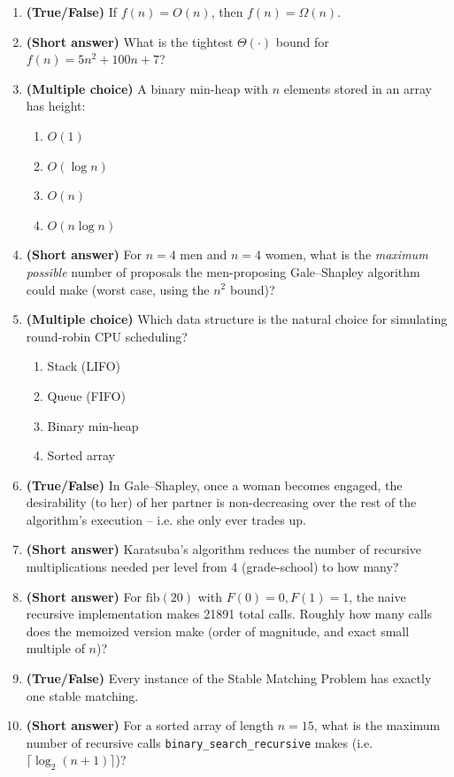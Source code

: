 \documentclass[11pt]{article}
\begin{document}
\begin{enumerate}[label=\textbf{B\arabic*.}, leftmargin=2.2em]

\item \textbf{(True/False)} If $f(n) = O(n)$, then $f(n) = \Omega(n)$.

\item \textbf{(Short answer)} What is the tightest $\Theta(\cdot)$ bound for
$f(n) = 5n^2 + 100n + 7$?

\item \textbf{(Multiple choice)} A binary min-heap with $n$ elements stored in an array
has height:
\begin{enumerate}[label=(\alph*)]
    \item $O(1)$
    \item $O(\log n)$
    \item $O(n)$
    \item $O(n \log n)$
\end{enumerate}

\item \textbf{(Short answer)} For $n=4$ men and $n=4$ women, what is the \emph{maximum
possible} number of proposals the men-proposing Gale--Shapley algorithm could make
(worst case, using the $n^2$ bound)?

\item \textbf{(Multiple choice)} Which data structure is the natural choice for
simulating round-robin CPU scheduling?
\begin{enumerate}[label=(\alph*)]
    \item Stack (LIFO)
    \item Queue (FIFO)
    \item Binary min-heap
    \item Sorted array
\end{enumerate}

\item \textbf{(True/False)} In Gale--Shapley, once a woman becomes engaged, the
desirability (to her) of her partner is non-decreasing over the rest of the algorithm's
execution -- i.e. she only ever trades up.

\item \textbf{(Short answer)} Karatsuba's algorithm reduces the number of recursive
multiplications needed per level from 4 (grade-school) to how many?

\item \textbf{(Short answer)} For $\text{fib}(20)$ with $F(0)=0, F(1)=1$, the naive
recursive implementation makes 21891 total calls. Roughly how many calls does the
memoized version make (order of magnitude, and exact small multiple of $n$)?

\item \textbf{(True/False)} Every instance of the Stable Matching Problem has exactly one
stable matching.

\item \textbf{(Short answer)} For a sorted array of length $n=15$, what is the maximum
number of recursive calls \texttt{binary\_search\_recursive} makes (i.e.
$\lceil \log_2(n+1) \rceil$)?

\end{enumerate}
\end{document}
